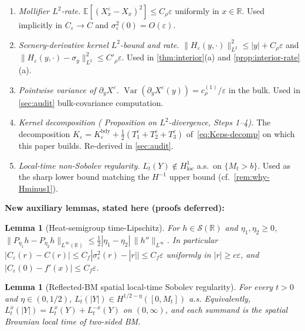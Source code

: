 \documentclass[11pt,reqno]{amsart}
\theoremstyle{plain}
\newtheorem{lemma}[theorem]{Lemma}
\theoremstyle{definition}
\theoremstyle{remark}
\newcommand{\R}{\mathbb{R}}
\newcommand{\E}{\mathbb{E}}
\DeclareMathOperator{\Var}{Var}
\begin{document}
\begin{enumerate}
\item \emph{Mollifier $L^{2}$-rate.}
$\E[(X^{\varepsilon}_{x}-X_{x})^{2}]\le C_{\rho}\varepsilon$
uniformly in $x\in\R$. Used implicitly in $C_{\varepsilon}\to C$ and
$\sigma_{\varepsilon}^{2}(0)=O(\varepsilon)$.
\item \emph{Scenery-derivative kernel $L^{2}$-bound and rate.}
$\|H_{\varepsilon}(y,\cdot)\|_{L^{2}}^{2}\le|y|+C_{\rho}\varepsilon$
and $\|H_{\varepsilon}(y,\cdot)-\sigma_{y}\|_{L^{2}}^{2}\le
C'_{\rho}\varepsilon$. Used in \cref{thm:interior}(a) and
\cref{prop:interior-rate}(a).
\item \emph{Pointwise variance of $\partial_{y}X^{\varepsilon}$.}
$\Var(\partial_{y}X^{\varepsilon}(y))=c_{\rho}^{(1)}/\varepsilon$ in
the bulk. Used in \cref{sec:audit} bulk-covariance computation.
\item \emph{Kernel decomposition (\cite{Fontes-EnergyFirst}
Proposition on $L^{2}$-divergence, Steps 1--4).} The decomposition
$K_{\varepsilon}=K_{\varepsilon}^{\mathrm{bdy}}+\tfrac12(T_{1}^{\varepsilon}+T_{2}^{\varepsilon}+T_{3}^{\varepsilon})$
of~\eqref{eq:Keps-decomp} on which this paper builds. Re-derived in
\cref{sec:audit}.
\item \emph{Local-time non-Sobolev regularity.}
$L_{t}^{\cdot}(Y)\notin H^{1}_{\mathrm{loc}}$ a.s.\ on
$\{M_{t}>b\}$. Used as the sharp lower bound matching the
$H^{-1}$ upper bound (cf.\ \cref{rem:why-Hminus1}).
\end{enumerate}

\noindent\textbf{New auxiliary lemmas, stated here (proofs deferred):}

\begin{lemma}[Heat-semigroup time-Lipschitz]\label{lem:heat-rate}
For $h\in\mathscr S(\R)$ and $\eta_{1},\eta_{2}\ge 0$,
$\|P_{\eta_{1}}h-P_{\eta_{2}}h\|_{L^{\infty}(\R)}\le
\tfrac12|\eta_{1}-\eta_{2}|\,\|h''\|_{L^{\infty}}$. In particular
$|C_{\varepsilon}(r)-C(r)|\le C_{f}|\sigma_{\varepsilon}^{2}(r)-|r||\le
C_{f}\varepsilon$ uniformly in $|r|\ge c\varepsilon$, and
$|C_{\varepsilon}(0)-f'(x)|\le C_{f}\varepsilon$.
\end{lemma}

\begin{lemma}[Reflected-BM spatial local-time Sobolev regularity]
\label{lem:lt-H12-eta}
For every $t>0$ and $\eta\in(0,1/2)$,
$L_{t}^{\cdot}(|Y|)\in H^{1/2-\eta}([0,M_{t}])$ a.s. Equivalently,
$L_{t}^{x}(|Y|)=L_{t}^{x}(Y)+L_{t}^{-x}(Y)$ on $(0,\infty)$, and
each summand is the spatial Brownian local time of two-sided BM.
\end{lemma}
\end{document}
